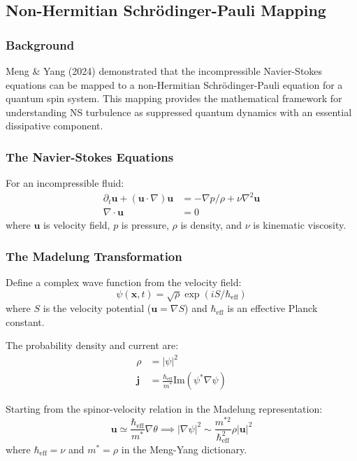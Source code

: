 \documentclass[11pt]{article}
\begin{document}
\subsection{Non-Hermitian Schr\"odinger-Pauli Mapping}
\label{subsec:ns-spinor-mapping}

\subsubsection{Background}

Meng \& Yang (2024) demonstrated that the incompressible Navier-Stokes equations can be mapped to a non-Hermitian Schr\"odinger-Pauli equation for a quantum spin system. This mapping provides the mathematical framework for understanding NS turbulence as suppressed quantum dynamics with an essential dissipative component.

\subsubsection{The Navier-Stokes Equations}

For an incompressible fluid:
\begin{align}
\partial_t \mathbf{u} + (\mathbf{u} \cdot \nabla)\mathbf{u} &= -\nabla p/\rho + \nu \nabla^2 \mathbf{u} \\
\nabla \cdot \mathbf{u} &= 0
\end{align}
where $\mathbf{u}$ is velocity field, $p$ is pressure, $\rho$ is density, and $\nu$ is kinematic viscosity.

\subsubsection{The Madelung Transformation}

Define a complex wave function from the velocity field:
\begin{equation}
\psi(\mathbf{x},t) = \sqrt{\rho} \exp(iS/\hbar_{\text{eff}})
\end{equation}
where $S$ is the velocity potential ($\mathbf{u} = \nabla S$) and $\hbar_{\text{eff}}$ is an effective Planck constant.

The probability density and current are:
\begin{align}
\rho &= |\psi|^2 \\
\mathbf{j} &= \frac{\hbar_{\text{eff}}}{m^*} \text{Im}(\psi^* \nabla \psi)
\end{align}

Starting from the spinor-velocity relation in the Madelung representation:
\begin{equation}
\mathbf{u} \simeq \frac{\hbar_{\text{eff}}}{m^*}\nabla\theta \implies |\nabla\psi|^2 \sim \frac{m^{*2}}{\hbar_{\text{eff}}^2}\rho|\mathbf{u}|^2
\end{equation}
where $\hbar_{\text{eff}} = \nu$ and $m^* = \rho$ in the Meng-Yang dictionary.
\end{document}
